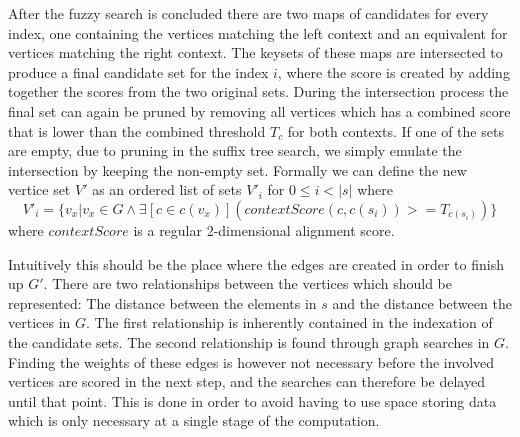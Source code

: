 \documentclass[thesis.tex]{subfiles}
\begin{document}
\par\noindent
After the fuzzy search is concluded there are two maps of candidates for every index, one containing the vertices matching the left context and an equivalent for vertices matching the right context. The keysets of these maps are intersected to produce a final candidate set for the index $i$, where the score is created by adding together the scores from the two original sets. During the intersection process the final set can again be pruned by removing all vertices which has a combined score that is lower than the combined threshold $T_c$ for both contexts. If one of the sets are empty, due to pruning in the suffix tree search, we simply emulate the intersection by keeping the non-empty set. Formally we can define the new vertice set $V'$ as an ordered list of sets $V'_i$ for $0 \leq i < |s|$ where
\begin{equation}
  V'_i=\{v_x|v_x \in G \land \exists [c \in c(v_x)](contextScore(c, c(s_i)) >= T_{c(s_i)})\}
\end{equation}
where $contextScore$ is a regular 2-dimensional alignment score.\\
\par\noindent
Intuitively this should be the place where the edges are created in order to finish up $G'$. There are two relationships between the vertices which should be represented: The distance between the elements in $s$ and the distance between the vertices in $G$. The first relationship is inherently contained in the indexation of the candidate sets. The second relationship is found through graph searches in $G$. Finding the weights of these edges is however not necessary before the involved vertices are scored in the next step, and the searches can therefore be delayed until that point. This is done in order to avoid having to use space storing data which is only necessary at a single stage of the computation.
\end{document}
